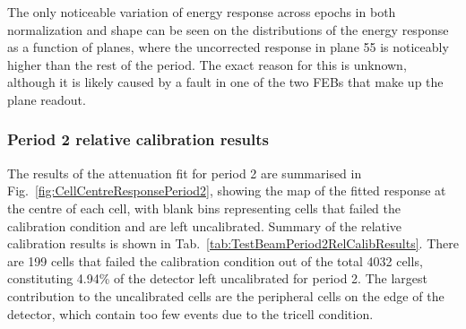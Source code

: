 The only noticeable variation of energy response across epochs in both normalization and shape can be seen on the distributions of the energy response as a function of planes, where the uncorrected response in plane 55 is noticeably higher than the rest of the period. The exact reason for this is unknown, although it is likely caused by a fault in one of the two \glspl{FEB} that make up the plane readout.

\subsubsection*{Period 2 relative calibration results}

The results of the attenuation fit for period 2 are summarised in Fig.~\ref{fig:CellCentreResponsePeriod2}, showing the map of the fitted response at the centre of each cell, with blank bins representing cells that failed the calibration condition and are left uncalibrated. Summary of the relative calibration results is shown in Tab.~\ref{tab:TestBeamPeriod2RelCalibResults}. There are 199 cells that failed the calibration condition out of the total 4032 cells, constituting 4.94\% of the detector left uncalibrated for period 2. The largest contribution to the uncalibrated cells are the peripheral cells on the edge of the detector, which contain too few events due to the tricell condition.

